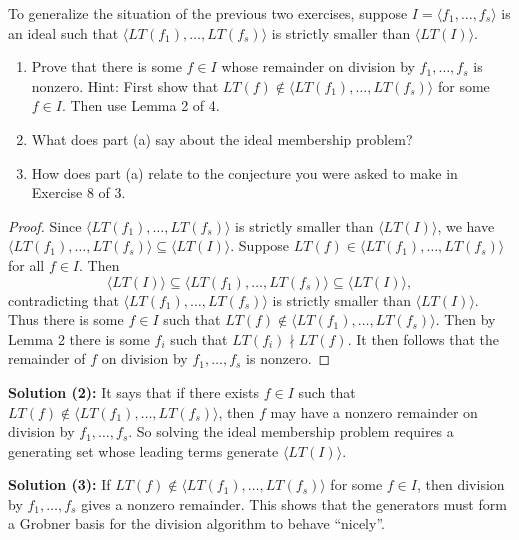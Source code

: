 \begin{tcolorbox}[title=Problem 3, breakable]
    To generalize the situation of the previous two 
        exercises, suppose $I = \langle f_1, \ldots, f_s \rangle$
        is an ideal such that $\langle LT(f_1), \ldots, LT(f_s) \rangle$ is 
        strictly smaller than $\langle LT(I) \rangle$.
    \begin{enumerate}
        \item Prove that there is some $f \in I$ whose remainder 
        on division by $f_1, \ldots, f_s$ is nonzero.
        Hint: First show that $LT(f) \notin \langle LT(f_1), \ldots, LT(f_s) \rangle$
        for some $f \in I$. Then use Lemma 2 of 4.
        \item What does part (a) say about the ideal membership problem?
        \item How does part (a) relate to the conjecture you were asked to make in Exercise 8 of 3.
    \end{enumerate}
\end{tcolorbox}

\begin{proof}
    Since $\langle LT(f_1), \ldots, LT(f_s) \rangle$ is 
        strictly smaller than $\langle LT(I) \rangle$, we have 
        $\langle LT(f_1), \ldots, LT(f_s) \rangle \subseteq \langle LT(I) \rangle$.
    Suppose $LT(f) \in \langle LT(f_1), \ldots, LT(f_s) \rangle$ for all $f \in I$.
    Then 
    \[
        \langle LT(I) \rangle \subseteq \langle LT(f_1), \ldots, LT(f_s) \rangle \subseteq \langle LT(I) \rangle,
    \]
    contradicting that $\langle LT(f_1), \ldots, LT(f_s) \rangle$ is 
        strictly smaller than $\langle LT(I) \rangle$.
    Thus there is some $f \in I$ such that $LT(f) \notin \langle LT(f_1), \ldots, LT(f_s) \rangle$.
    Then by Lemma 2 there is some $f_i$ such that $LT(f_i) \nmid LT(f)$.
    It then follows that the remainder of $f$ on division by $f_1, \ldots, f_s$ is nonzero.
\end{proof}

\textbf{Solution (2):} It says that if there exists $f \in I$ such that $LT(f) \notin \langle LT(f_1), \ldots, LT(f_s) \rangle$, 
    then $f$ may have a nonzero remainder on division by $f_1, \ldots, f_s$. 
    So solving the ideal membership problem requires a generating set whose leading terms generate $\langle LT(I) \rangle$.

\textbf{Solution (3):} 
If $LT(f) \notin \langle LT(f_1), \ldots, LT(f_s) \rangle$ for some $f \in I$, 
then division by $f_1, \ldots, f_s$ gives a nonzero remainder. 
This shows that the generators must form a Grobner basis for the division algorithm to behave ``nicely''.

